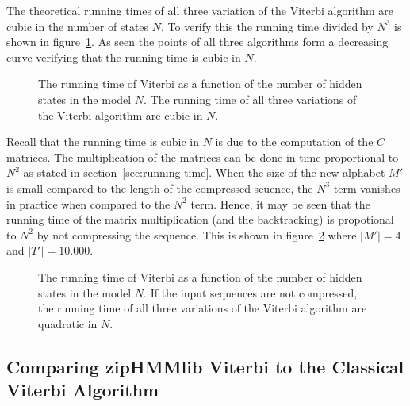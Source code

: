 The theoretical running times of all three variation of the Viterbi algorithm
are cubic in the number of states $N$. To verify this the running time divided
by $N^3$ is shown in figure~\ref{fig:assymptotic_viterbi_backtrack_N}. As seen
the points of all three algorithms form a decreasing curve verifying that the
running time is cubic in $N$.

\begin{figure}
  \centering
  
  \caption{The running time of Viterbi as a function of the number of hidden
    states in the model $N$. The running time of all three variations of the Viterbi
    algorithm are cubic in $N$.}
  \label{fig:assymptotic_viterbi_backtrack_N}
\end{figure}

Recall that the running time is cubic in $N$ is due to the computation of the
$C$ matrices. The multiplication of the matrices can be done in time
proportional to $N^2$ as stated in section~\ref{sec:running-time}. When the
size of the new alphabet $M'$ is small compared to the length of the compressed
seuence, the $N^3$ term vanishes in practice when compared to the $N^2$
term. Hence, it may be seen that the running time of the matrix multiplication
(and the backtracking) is propotional to $N^2$ by not compressing the
sequence. This is shown in figure~\ref{fig:assymptotic_viterbi_N} where
$\lvert M' \rvert = 4$ and $\lvert T' \rvert = 10.000$.

\begin{figure}
  \centering
  
  \caption{The running time of Viterbi as a function of the number of hidden
    states in the model $N$. If the input sequences are not compressed, the
    running time of all three variations of the Viterbi algorithm are quadratic
    in $N$.}
  \label{fig:assymptotic_viterbi_N}
\end{figure}


\subsection{Comparing zipHMMlib Viterbi to the Classical Viterbi Algorithm}
\label{sec:comp-ziphmml-viterbi}

